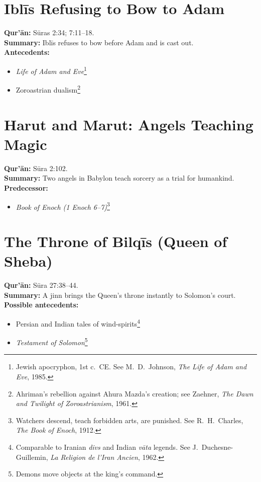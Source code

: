 \documentclass[11pt,a4paper]{article}
\begin{document}
\section{Iblīs Refusing to Bow to Adam}
\textbf{Qur’ān:} Sūras 2:34; 7:11–18.\\
\textbf{Summary:} Iblīs refuses to bow before Adam and is cast out.\\
\textbf{Antecedents:}
\begin{itemize}
  \item \emph{Life of Adam and Eve}\footnote{Jewish apocryphon, 1st c.\ CE. See M.\ D.\ Johnson, \emph{The Life of Adam and Eve}, 1985.}
  \item Zoroastrian dualism\footnote{Ahriman’s rebellion against Ahura Mazda’s creation; see Zaehner, \emph{The Dawn and Twilight of Zoroastrianism}, 1961.}
\end{itemize}

\section{Harut and Marut: Angels Teaching Magic}
\textbf{Qur’ān:} Sūra 2:102.\\
\textbf{Summary:} Two angels in Babylon teach sorcery as a trial for humankind.\\
\textbf{Predecessor:}
\begin{itemize}
  \item \emph{Book of Enoch (1 Enoch 6–7)}\footnote{Watchers descend, teach forbidden arts, are punished. See R.\ H.\ Charles, \emph{The Book of Enoch}, 1912.}
\end{itemize}

\section{The Throne of Bilqīs (Queen of Sheba)}
\textbf{Qur’ān:} Sūra 27:38–44.\\
\textbf{Summary:} A jinn brings the Queen’s throne instantly to Solomon’s court.\\
\textbf{Possible antecedents:}
\begin{itemize}
  \item Persian and Indian tales of wind-spirits\footnote{Comparable to Iranian \emph{divs} and Indian \emph{vāta} legends. See J.\ Duchesne-Guillemin, \emph{La Religion de l’Iran Ancien}, 1962.}
  \item \emph{Testament of Solomon}\footnote{Demons move objects at the king’s command.}
\end{itemize}
\end{document}
